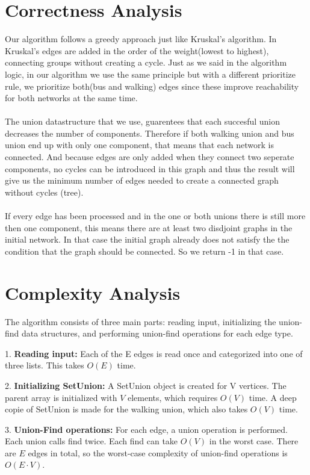 \documentclass[a4paper]{article}
\begin{document}
\section{Correctness Analysis}
Our algorithm follows a greedy approach just like Kruskal's algorithm. In Kruskal's edges are added in the order of the weight(lowest to highest), connecting groups without creating a cycle. Just as we said in the algorithm logic, in our algorithm we use the same principle but with a different prioritize rule, we prioritize both(bus and walking) edges since these improve reachability for both networks at the same time.
\\
\\
The union datastructure that we use, guarentees that each succesful union decreases the number of components.
Therefore if both walking union and bus union end up with only one component, that means that each network is connected.
And because edges are only added when they connect two seperate components, no cycles can be introduced in this graph and thus the result will give us the minimum number of edges needed to create a connected graph without cycles (tree).
\\
\\
If every edge has been processed and in the one or both unions there is still more then one component, this means there are at least two disdjoint graphs in the initial network. 
In that case the initial graph already does not satisfy the the condition that the graph should be connected. So we return -1 in that case.



\section{Complexity Analysis}
The algorithm consists of three main parts: reading input, initializing the union-find data structures, and performing union-find operations for each edge type. 

1. \textbf{Reading input:} Each of the E edges is read once and categorized into one of three lists. This takes $O(E)$ time. 

2. \textbf{Initializing SetUnion:} A SetUnion object is created for V vertices. The parent array is initialized with $V$ elements, which requires $O(V)$ time. A deep copie of SetUnion is made for the walking union, which also takes $O(V)$ time.

3. \textbf{Union-Find operations:} For each edge, a union operation is performed. Each union calls find twice. Each find can take $O(V)$ in the worst case. There are $E$ edges in total, so the worst-case complexity of union-find operations is $O(E \cdot V)$.  
\end{document}
